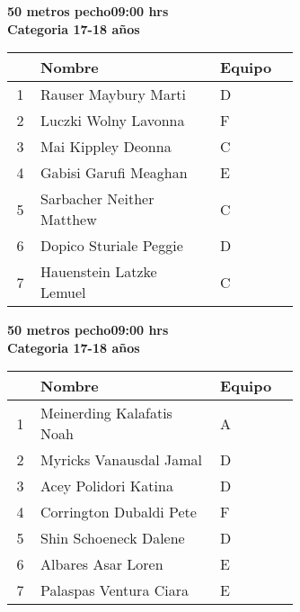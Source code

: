 \begin{minipage}{0.95\linewidth}\vspace{0.5cm} 
\begin{flushleft}
\textbf{
\hspace{-0.15cm}50 metros pecho\hspace{1.5cm}09:00 hrs \\Categoria 17-18 años}\vspace{-0.2cm} 
\end{flushleft}
\begin{tabular}{cp{0.63\linewidth}l}
\hline
& \textbf{Nombre} & \textbf{Equipo} \\ \hline
1 & Rauser Maybury Marti & D \\ 
2 & Luczki Wolny Lavonna & F \\ 
3 & Mai Kippley Deonna & C \\ 
4 & Gabisi Garufi Meaghan & E \\ 
5 & Sarbacher Neither Matthew & C \\ 
6 & Dopico Sturiale Peggie & D \\ 
7 & Hauenstein Latzke Lemuel & C \\ 
\end{tabular}
\end{minipage}
\begin{minipage}{0.95\linewidth}\vspace{0.5cm} 
\begin{flushleft}
\textbf{
\hspace{-0.15cm}50 metros pecho\hspace{1.5cm}09:00 hrs \\Categoria 17-18 años}\vspace{-0.2cm} 
\end{flushleft}
\begin{tabular}{cp{0.63\linewidth}l}
\hline
& \textbf{Nombre} & \textbf{Equipo} \\ \hline
1 & Meinerding Kalafatis Noah & A \\ 
2 & Myricks Vanausdal Jamal & D \\ 
3 & Acey Polidori Katina & D \\ 
4 & Corrington Dubaldi Pete & F \\ 
5 & Shin Schoeneck Dalene & D \\ 
6 & Albares Asar Loren & E \\ 
7 & Palaspas Ventura Ciara & E \\ 
\end{tabular}
\end{minipage}
